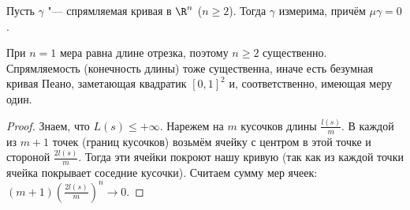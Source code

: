 \begin{lemma}
	Пусть $\gamma$ "--- спрямляемая кривая в $\R^n$ ($n \ge 2$).
	Тогда $\gamma$ измерима, причём $\mu \gamma = 0$.
\end{lemma}
\begin{Rem}
	При $n=1$ мера равна длине отрезка, поэтому $n \ge 2$ существенно.
	Спрямляемость (конечность длины) тоже существенна, иначе есть безумная кривая Пеано, заметающая квадратик $[0,1]^2$ и, соответственно, имеющая меру один.
\end{Rem}
\begin{proof}
	Знаем, что $L(s) \le +\infty$.
	Нарежем на $m$ кусочков длины $\frac{l(s)}{m}$.
	В каждой из $m+1$ точек (границ кусочков) возьмём ячейку с центром в этой точке и стороной $\frac{2l(s)}{m}$.
	Тогда эти ячейки покроют нашу кривую (так как из каждой точки ячейка покрывает соседние кусочки).
	Считаем сумму мер ячеек: $(m+1)\left(\frac{2l(s)}{m}\right)^n \to 0$.
\end{proof}
